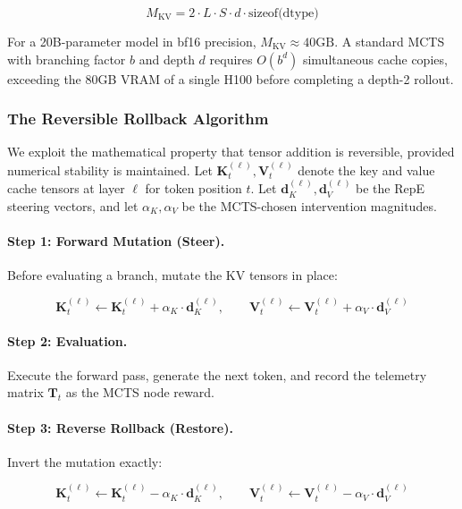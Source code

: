 \documentclass{article}
\begin{document}
\begin{equation}
M_{\text{KV}} = 2 \cdot L \cdot S \cdot d \cdot \text{sizeof(dtype)}
\label{eq:kv_memory}
\end{equation}

For a 20B-parameter model in bf16 precision, $M_{\text{KV}} \approx 40\text{GB}$. A standard MCTS with branching factor $b$ and depth $d$ requires $O(b^d)$ simultaneous cache copies, exceeding the 80GB VRAM of a single H100 before completing a depth-2 rollout.

\subsubsection{The Reversible Rollback Algorithm}

We exploit the mathematical property that tensor addition is reversible, provided numerical stability is maintained. Let $\mathbf{K}_t^{(\ell)}, \mathbf{V}_t^{(\ell)}$ denote the key and value cache tensors at layer $\ell$ for token position $t$. Let $\mathbf{d}_K^{(\ell)}, \mathbf{d}_V^{(\ell)}$ be the RepE steering vectors, and let $\alpha_K, \alpha_V$ be the MCTS-chosen intervention magnitudes.

\paragraph{Step 1: Forward Mutation (Steer).} Before evaluating a branch, mutate the KV tensors in place:

\begin{equation}
\mathbf{K}_t^{(\ell)} \leftarrow \mathbf{K}_t^{(\ell)} + \alpha_K \cdot \mathbf{d}_K^{(\ell)}, \qquad \mathbf{V}_t^{(\ell)} \leftarrow \mathbf{V}_t^{(\ell)} + \alpha_V \cdot \mathbf{d}_V^{(\ell)}
\label{eq:forward_mutation}
\end{equation}

\paragraph{Step 2: Evaluation.} Execute the forward pass, generate the next token, and record the telemetry matrix $\mathbf{T}_t$ as the MCTS node reward.

\paragraph{Step 3: Reverse Rollback (Restore).} Invert the mutation exactly:

\begin{equation}
\mathbf{K}_t^{(\ell)} \leftarrow \mathbf{K}_t^{(\ell)} - \alpha_K \cdot \mathbf{d}_K^{(\ell)}, \qquad \mathbf{V}_t^{(\ell)} \leftarrow \mathbf{V}_t^{(\ell)} - \alpha_V \cdot \mathbf{d}_V^{(\ell)}
\label{eq:reverse_rollback}
\end{equation}
\end{document}
